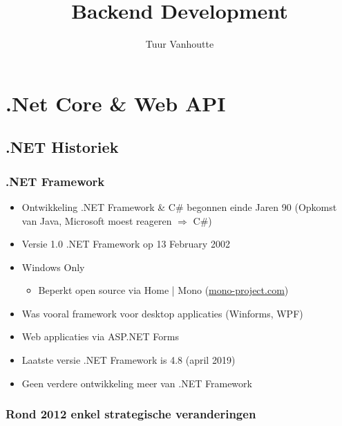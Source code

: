 \documentclass{article}
\begin{document}
\begin{titlepage}
    \author{Tuur Vanhoutte}
    \title{Backend Development}
\end{titlepage}

\maketitle
\newpage
\tableofcontents
\newpage


\section{.Net Core \& Web API}

\subsection{.NET Historiek}

\subsubsection{.NET Framework}

\begin{itemize}
    \item Ontwikkeling .NET Framework \& C\# begonnen einde Jaren 90 (Opkomst van Java, Microsoft moest reageren $\Rightarrow$ C\#)
    \item Versie 1.0 .NET Framework op 13 February 2002
    \item Windows Only
    \begin{itemize}
        \item Beperkt open source via Home | Mono (\url{mono-project.com})
    \end{itemize}
    \item Was vooral framework voor desktop applicaties (Winforms, WPF)
    \item Web applicaties via ASP.NET Forms
    \item Laatste versie .NET Framework is 4.8 (april 2019)
    \item Geen verdere ontwikkeling meer van .NET Framework
\end{itemize}

\subsubsection{Rond 2012 enkel strategische veranderingen}
\end{document}
